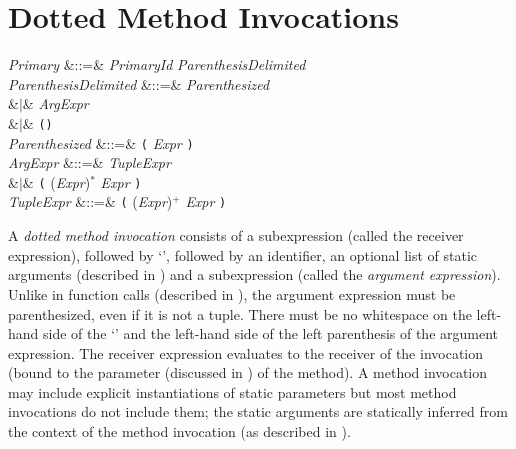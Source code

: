 %
%
%
%

\section{Dotted Method Invocations}

\begin{Grammar}
\emph{Primary}
&::=& \emph{Primary}\emph{Id}
 \emph{ParenthesisDelimited}\\

\emph{ParenthesisDelimited}
&::=& \emph{Parenthesized}\\
&$|$& \emph{ArgExpr}\\
&$|$& \texttt(\texttt)\\

\emph{Parenthesized} &::=& \texttt( \emph{Expr} \texttt)\\

\emph{ArgExpr}
&::=& \emph{TupleExpr}\\
&$|$& \texttt( (\emph{Expr}\EXP{,})$^*$ \emph{Expr} \texttt)\\

\emph{TupleExpr}
&::=& \texttt( (\emph{Expr}\EXP{,})$^+$ \emph{Expr} \texttt)\\

\end{Grammar}

A \emph{dotted method invocation} consists of a subexpression
(called the receiver expression), followed by `',
followed by an identifier, an optional list of static arguments
(described in )
and a subexpression (called the \emph{argument expression}).
Unlike in function calls (described in ),
the argument expression must be parenthesized, even if it is not a tuple.
There must be no whitespace on the left-hand side of the `' and
the left-hand side of the left parenthesis of the argument expression.
The receiver expression evaluates to the receiver of the invocation (bound
to the  parameter (discussed in ) of the method).
A method invocation may include explicit instantiations of static parameters
but most method invocations do not include them; the static arguments
are statically inferred from the context of the method invocation (as
described in ).

